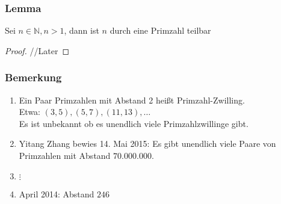 \documentclass{article}
\begin{document}
    \subsubsection{Lemma}
      Sei $n \in \mathbb{N}, n>1$, dann ist $n$ durch eine Primzahl teilbar
      \begin{proof}
        //Later
      \end{proof}

    \subsubsection{Bemerkung}
      \begin{enumerate}[label=(\roman*)]
        \item Ein Paar Primzahlen mit Abstand 2 heißt Primzahl-Zwilling.\\
          Etwa: $(3,5), (5,7), (11,13), \dotsc$ \\
          Es ist unbekannt ob es unendlich viele Primzahlzwillinge gibt.
        \item Yitang Zhang bewies 14. Mai 2015: Es gibt unendlich viele Paare von
          Primzahlen mit Abstand $70.000.000$.
        \item $\vdots$
        \item April 2014: Abstand $246$
      \end{enumerate}
\end{document}
